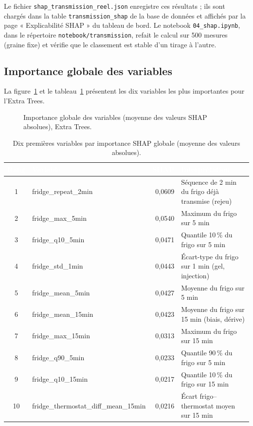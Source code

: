 Le fichier \texttt{shap\_transmission\_reel.json} enregistre ces résultats ;
ils sont chargés dans la table \texttt{transmission\_shap} de la base de
données et affichés par la page « Explicabilité SHAP » du tableau de bord.
Le notebook \texttt{04\_shap.ipynb}, dans le répertoire
\texttt{notebook/transmission}, refait le calcul sur 500 mesures (graine
fixe) et vérifie que le classement est stable d'un tirage à l'autre.

\subsection{Importance globale des variables}

La figure~\ref{fig:expl_shap_global} et le
tableau~\ref{tab:expl_shap_global} présentent les dix variables les plus
importantes pour l'Extra Trees.

\begin{figure}[H]
\centering
{}
\caption{Importance globale des variables (moyenne des valeurs SHAP
absolues), Extra Trees.}
\label{fig:expl_shap_global}
\end{figure}

\begin{table}[H]
\centering
\small
\renewcommand{\arraystretch}{1.3}
\setlength{\tabcolsep}{4pt}
\caption{Dix premières variables par importance SHAP globale (moyenne des
valeurs absolues).}
\label{tab:expl_shap_global}
\begin{tabularx}{\textwidth}{@{}|c|>{\ttfamily\footnotesize}l|r|>{\raggedright\arraybackslash}X|@{}}
\hline
\rowcolor{thead}
\textcolor{white}{\textbf{Rang}} & \textcolor{white}{\textbf{Variable}} &
\textcolor{white}{\textbf{SHAP}} &
\textcolor{white}{\textbf{Interprétation}} \\
\hline
1 & fridge\_repeat\_2min & 0,0609 & Séquence de 2 min du frigo déjà transmise
(rejeu) \\
\rowcolor{trowa}
2 & fridge\_max\_5min & 0,0540 & Maximum du frigo sur 5 min \\
3 & fridge\_q10\_5min & 0,0471 & Quantile 10\,\% du frigo sur 5 min \\
\rowcolor{trowa}
4 & fridge\_std\_1min & 0,0443 & Écart-type du frigo sur 1 min (gel,
injection) \\
5 & fridge\_mean\_5min & 0,0427 & Moyenne du frigo sur 5 min \\
\rowcolor{trowa}
6 & fridge\_mean\_15min & 0,0423 & Moyenne du frigo sur 15 min (biais,
dérive) \\
7 & fridge\_max\_15min & 0,0313 & Maximum du frigo sur 15 min \\
\rowcolor{trowa}
8 & fridge\_q90\_5min & 0,0233 & Quantile 90\,\% du frigo sur 5 min \\
9 & fridge\_q10\_15min & 0,0217 & Quantile 10\,\% du frigo sur 15 min \\
\rowcolor{trowa}
10 & fridge\_thermostat\_diff\_mean\_15min & 0,0216 & Écart frigo--thermostat
moyen sur 15 min \\
\hline
\end{tabularx}
\end{table}

